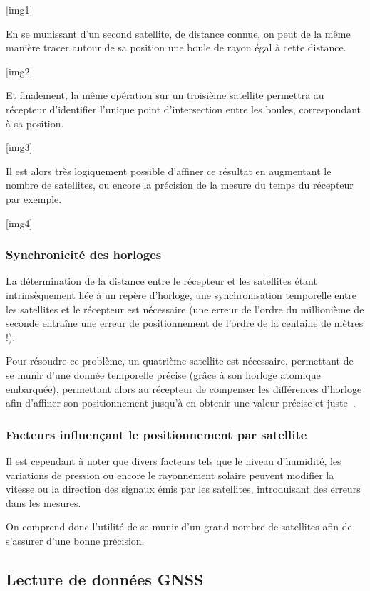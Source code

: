          [img1]

         En se munissant d'un second satellite, de distance connue, on peut de la même manière tracer autour de sa position une boule de rayon égal à cette distance.

         [img2]

         Et finalement, la même opération sur un troisième satellite permettra au récepteur d'identifier l'unique point d'intersection entre les boules, correspondant à sa position.

         [img3]

         Il est alors très logiquement possible d'affiner ce résultat en augmentant le nombre de satellites, ou encore la précision de la mesure du temps du récepteur par exemple.

         [img4]

      \subsubsection{Synchronicité des horloges}
         La détermination de la distance entre le récepteur et les satellites étant intrinsèquement liée à un repère d'horloge, une synchronisation temporelle entre les satellites et le récepteur est nécessaire (une erreur de l'ordre du millionième de seconde entraîne une erreur de positionnement de l'ordre de la centaine de mètres !).

         Pour résoudre ce problème, un quatrième satellite est nécessaire, permettant de se munir d'une donnée temporelle précise (grâce à son horloge atomique embarquée), permettant alors au récepteur de compenser les différences d'horloge afin d'affiner son positionnement jusqu'à en obtenir une valeur précise et juste~\cite{gebre-egziabherGNSSApplicationsMethods2009}.

      \subsubsection{Facteurs influençant le positionnement par satellite}
         Il est cependant à noter que divers facteurs tels que le niveau d'humidité, les variations de pression ou encore le rayonnement solaire peuvent modifier la vitesse ou la direction des signaux émis par les satellites, introduisant des erreurs dans les mesures.

         On comprend donc l'utilité de se munir d'un grand nombre de satellites afin de s'assurer d'une bonne précision.

   \subsection{Lecture de données GNSS}\label{subsec:lecture-de-donnees-gnss-format-nmea}
